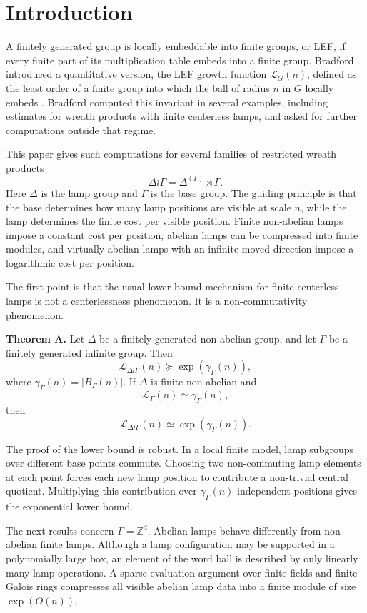 \documentclass[11pt]{article}
\newcommand{\LEF}{\mathcal L}
\newcommand{\Z}{\mathbb Z}
\begin{document}
\tableofcontents

\section{Introduction}

A finitely generated group is locally embeddable into finite groups, or LEF, if every finite part of its multiplication table embeds into a finite group. Bradford introduced a quantitative version, the LEF growth function \(\LEF_G(n)\), defined as the least order of a finite group into which the ball of radius \(n\) in \(G\) locally embeds \cite{Bradford2022}. Bradford computed this invariant in several examples, including estimates for wreath products with finite centerless lamps, and asked for further computations outside that regime.

This paper gives such computations for several families of restricted wreath products
\[
\Delta\wr\Gamma=\Delta^{(\Gamma)}\rtimes\Gamma.
\]
Here \(\Delta\) is the lamp group and \(\Gamma\) is the base group. The guiding principle is that the base determines how many lamp positions are visible at scale \(n\), while the lamp determines the finite cost per visible position. Finite non-abelian lamps impose a constant cost per position, abelian lamps can be compressed into finite modules, and virtually abelian lamps with an infinite moved direction impose a logarithmic cost per position.

The first point is that the usual lower-bound mechanism for finite centerless lamps is not a centerlessness phenomenon. It is a non-commutativity phenomenon.

\noindent\textbf{Theorem A.}
Let \(\Delta\) be a finitely generated non-abelian group, and let \(\Gamma\) be a finitely generated infinite group. Then
\[
\LEF_{\Delta\wr\Gamma}(n)\succeq \exp(\gamma_\Gamma(n)),
\]
where \(\gamma_\Gamma(n)=|B_\Gamma(n)|\). If \(\Delta\) is finite non-abelian and
\[
\LEF_\Gamma(n)\simeq \gamma_\Gamma(n),
\]
then
\[
\LEF_{\Delta\wr\Gamma}(n)\simeq \exp(\gamma_\Gamma(n)).
\]

The proof of the lower bound is robust. In a local finite model, lamp subgroups over different base points commute. Choosing two non-commuting lamp elements at each point forces each new lamp position to contribute a non-trivial central quotient. Multiplying this contribution over \(\gamma_\Gamma(n)\) independent positions gives the exponential lower bound.

The next results concern \(\Gamma=\Z^d\). Abelian lamps behave differently from non-abelian finite lamps. Although a lamp configuration may be supported in a polynomially large box, an element of the word ball is described by only linearly many lamp operations. A sparse-evaluation argument over finite fields and finite Galois rings compresses all visible abelian lamp data into a finite module of size \(\exp(O(n))\).
\end{document}
